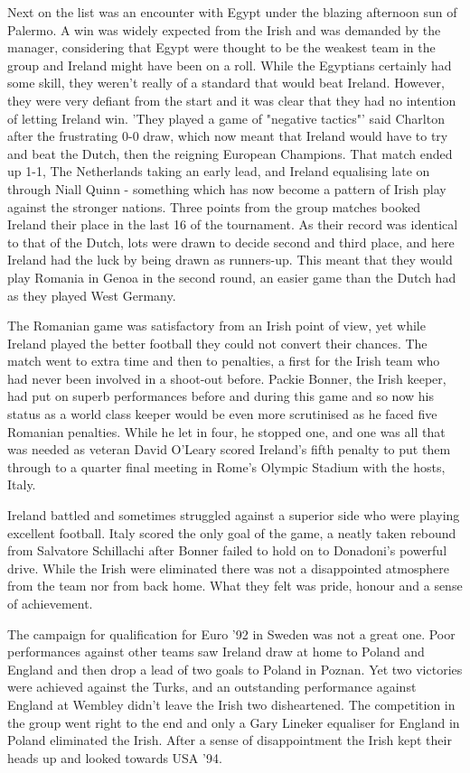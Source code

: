Next on the list was an encounter with Egypt under the blazing afternoon sun of
Palermo. A win was widely expected from the Irish and was demanded by the 
manager, considering that Egypt were thought to be the weakest team in the 
group and Ireland might have been on a roll. While the Egyptians certainly had 
some skill, they weren't really of a standard that would beat Ireland. However,
they were very defiant from the start and it was clear that they had no 
intention of letting Ireland win. 'They played a game of "negative tactics"' 
said Charlton after the frustrating 0-0 draw, which now meant that Ireland 
would have to try and beat the Dutch, then the reigning European Champions. 
That match ended up 1-1, The Netherlands taking an early lead, and Ireland 
equalising late on through Niall Quinn - something which has now become a 
pattern of Irish play against the stronger nations. Three points from the group
matches booked Ireland their place in the last 16 of the tournament. As their 
record was identical to that of the Dutch, lots were drawn to decide second and
third place, and here Ireland had the luck by being drawn as runners-up. This 
meant that they would play Romania in Genoa in the second round, an easier game 
than the Dutch had as they played West Germany.

The Romanian game was satisfactory from an Irish point of view, yet while 
Ireland played the better football they could not convert their chances. The
match went to extra time and then to penalties, a first for the Irish team who 
had never been involved in a shoot-out before. Packie Bonner, the Irish keeper,
had put on superb performances before and during this game and so now his 
status as a world class keeper would be even more scrutinised as he faced five
Romanian penalties. While he let in four, he stopped one, and one was all that 
was needed as veteran David O'Leary scored Ireland's fifth penalty to put them
through to a quarter final meeting in Rome's Olympic Stadium with the hosts,
Italy.

Ireland battled and sometimes struggled against a superior side who were 
playing excellent football. Italy scored the only goal of the game, a neatly 
taken rebound from Salvatore Schillachi after Bonner failed to hold on to 
Donadoni's powerful drive. While the Irish were eliminated there was not a
disappointed atmosphere from the team nor from back home. What they felt was
pride, honour and a sense of achievement.

The campaign for qualification for Euro '92 in Sweden was not a great one. Poor
performances against other teams saw Ireland draw at home to Poland and England
and then drop a lead of two goals to Poland in Poznan. Yet two victories were
achieved against the Turks, and an outstanding performance against England at
Wembley didn't leave the Irish two disheartened. The competition in the group
went right to the end and only a Gary Lineker equaliser for England in Poland
eliminated the Irish. After a sense of disappointment the Irish kept their 
heads up and looked towards USA '94.

